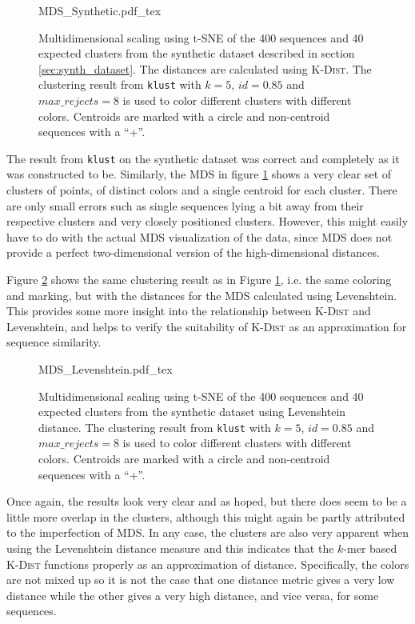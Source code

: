 \begin{figure}[h!]
  \def\svgwidth{\columnwidth}
  {MDS_Synthetic.pdf_tex}
  \caption{Multidimensional scaling using t-SNE of the 400 sequences and
    40 expected clusters from the synthetic dataset described in section
    \ref{sec:synth_dataset}. The distances are calculated using
    \textsc{K-Dist}. The clustering result from \texttt{klust} with $k=5$,
    $id=0.85$ and $max\_rejects=8$ is used to color different clusters with
    different colors. Centroids are marked with a circle and non-centroid
    sequences with a ``+''.}
  \label{fig:mds_synth}
\end{figure}

The result from \texttt{klust} on the synthetic dataset was correct and
completely as it was constructed to be. Similarly, the MDS in figure
\ref{fig:mds_synth} shows a very clear set of clusters of points, of distinct
colors and a single centroid for each cluster. There are only small errors such
as single sequences lying a bit away from their respective clusters and very
closely positioned clusters. However, this might easily have to do with the
actual MDS visualization of the data, since MDS does not provide a perfect
two-dimensional version of the high-dimensional distances.

Figure \ref{fig:mds_synth_lev} shows the same clustering result as in Figure
\ref{fig:mds_synth}, i.e. the same coloring and marking, but with the distances
for the MDS calculated using Levenshtein. This provides some more insight
into the relationship between \textsc{K-Dist} and Levenshtein, and helps to
verify the suitability of \textsc{K-Dist} as an approximation for sequence
similarity.

\begin{figure}[h!]
  \centering
  \def\svgwidth{\columnwidth}
  {MDS_Levenshtein.pdf_tex}
  \caption{Multidimensional scaling using t-SNE of the 400 sequences and 40
    expected clusters from the synthetic dataset using Levenshtein distance.
    The clustering result from \texttt{klust} with $k=5$, $id=0.85$ and
    $max\_rejects=8$ is used to color different clusters with different
    colors. Centroids are marked with a circle and non-centroid sequences
    with a ``+''.}
  \label{fig:mds_synth_lev}
\end{figure}

Once again, the results look very clear and as hoped, but there does seem to be
a little more overlap in the clusters, although this might again be partly
attributed to the imperfection of MDS. In any case, the clusters are also very
apparent when using the Levenshtein distance measure and this indicates that
the $k$-mer based \textsc{K-Dist} functions properly as an approximation of
distance. Specifically, the colors are not mixed up so it is not the case that
one distance metric gives a very low distance while the other gives a very
high distance, and vice versa, for some sequences.


